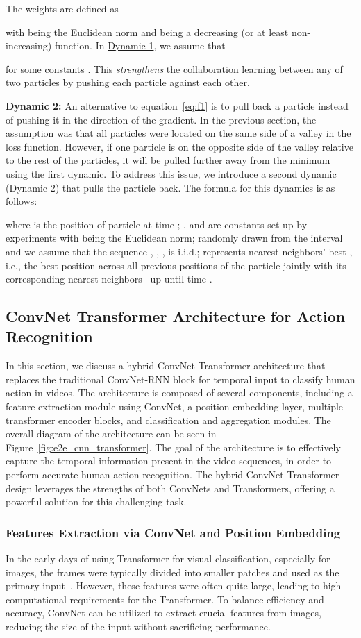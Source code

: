 \documentclass[fleqn,10pt]{wlscirep}
\begin{document}
The weights  are defined as

with  being the Euclidean norm and  being a decreasing (or at least non-increasing) function. In \underline{Dynamic 1}, we assume that

for some constants . This \emph{strengthens} the collaboration learning between any of two particles by pushing each particle against each other.



\textbf{Dynamic 2:} An alternative to equation~\eqref{eq:f1} is to pull back a particle instead of pushing it in the direction of the gradient. In the previous section, the assumption was that all particles were located on the same side of a valley in the loss function. However, if one particle is on the opposite side of the valley relative to the rest of the particles, it will be pulled further away from the minimum using the first dynamic. To address this issue, we introduce a second dynamic (Dynamic 2) that pulls the particle back. The formula for this dynamics is as follows:


where  is the position of particle  at time ; ,  and  are constants set up by experiments with  being the Euclidean norm;  randomly drawn from the interval  and we assume that the sequence , , ,  is i.i.d.;  represents nearest-neighbors' best , i.e., the best position across all previous positions of the particle  jointly with its corresponding nearest-neighbors~ up until time .
\subsection{ConvNet Transformer Architecture for Action Recognition}
\label{sec:cotrar}
In this section, we discuss a hybrid ConvNet-Transformer architecture that replaces the traditional ConvNet-RNN block for temporal input to classify human action in videos. 
The architecture is composed of several components, including a feature extraction module using ConvNet, a position embedding layer, multiple transformer encoder blocks, and classification and aggregation modules. The overall diagram of the architecture can be seen in Figure~\ref{fig:e2e_cnn_transformer}. The goal of the architecture is to effectively capture the temporal information present in the video sequences, in order to perform accurate human action recognition. The hybrid ConvNet-Transformer design leverages the strengths of both ConvNets and Transformers, offering a powerful solution for this challenging task.
\subsubsection{Features Extraction via ConvNet and Position Embedding} 
In the early days of using Transformer for visual classification, especially for images, the frames were typically divided into smaller patches and used as the primary input~\cite{liu2022video,liu2021swin,zhang2021vidtr}. However, these features were often quite large, leading to high computational requirements for the Transformer. To balance efficiency and accuracy, ConvNet can be utilized to extract crucial features from images, reducing the size of the input without sacrificing performance.
\end{document}
